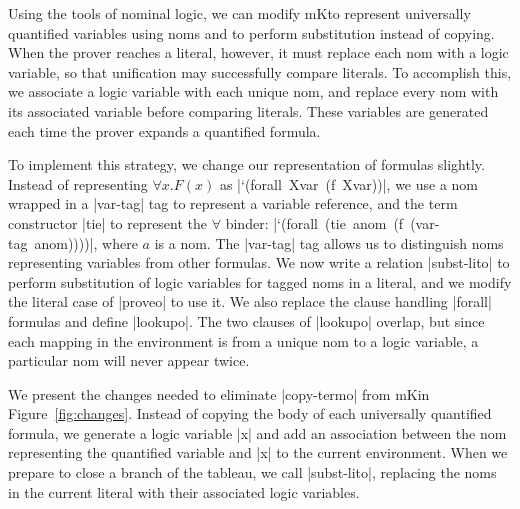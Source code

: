 Using the tools of nominal logic, we can modify mK\leantapsp to
represent universally quantified variables using noms and to perform
substitution instead of copying.  When the prover reaches a literal,
however, it must replace each nom with a logic variable, so that
unification may successfully compare literals. To accomplish this, we
associate a logic variable with each unique nom, and replace every nom
with its associated variable before comparing literals. These
variables are generated each time the prover expands a quantified
formula.

To implement this strategy, we change our representation of formulas
slightly. Instead of representing $\forall x. F(x)$ as
\mbox{\schemeresult|`(forall Xvar (f Xvar))|}, we use a nom wrapped in
a \scheme|var-tag| tag to represent a variable reference, and the
term constructor \scheme|tie| to represent the $\forall$ binder:
\mbox{\schemeresult|`(forall (tie anom (f (var-tag anom))))|}, where $a$ is
a nom.  The \scheme|var-tag| tag allows us to distinguish noms
representing variables from other formulas. We now write a relation
\scheme|subst-lito| to perform substitution of logic variables for
tagged noms in a literal, and we modify the literal case of
\scheme|proveo| to use it. We also replace the clause handling
\schemeresult|forall| formulas and define \scheme|lookupo|. The two
clauses of \scheme|lookupo| overlap, but since each mapping in the
environment is from a unique nom to a logic variable, a particular nom
will never appear twice.

We present the changes needed to eliminate \scheme|copy-termo| from
mK\leantapsp in Figure~\ref{fig:changes}. Instead of copying the body
of each universally quantified formula, we generate a logic variable
\scheme|x| and add an association between the nom representing the
quantified variable and \scheme|x| to the current environment. When we
prepare to close a branch of the tableau, we call \scheme|subst-lito|,
replacing the noms in the current literal with their associated logic
variables.


